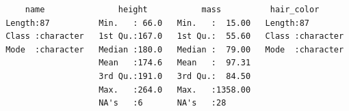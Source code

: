 \documentclass[
  letterpaper,
  DIV=11,
  numbers=noendperiod]{scrreprt}
\begin{document}
\begin{verbatim}
     name               height           mass          hair_color       
 Length:87          Min.   : 66.0   Min.   :  15.00   Length:87         
 Class :character   1st Qu.:167.0   1st Qu.:  55.60   Class :character  
 Mode  :character   Median :180.0   Median :  79.00   Mode  :character  
                    Mean   :174.6   Mean   :  97.31                     
                    3rd Qu.:191.0   3rd Qu.:  84.50                     
                    Max.   :264.0   Max.   :1358.00                     
                    NA's   :6       NA's   :28                          
                                                                        
                                                                        
                                                                        
                                                                        
                                                                        
                                                                        
                                                                        
                                                                        
                                                                        
                                                                        
                                                                        
                                                                        
                                                                        
                                                                        
                                                                        
                                                                        
                                                                        
                                                                        
                                                                        
                                                                        
                                                                        

\end{verbatim}
\end{document}
